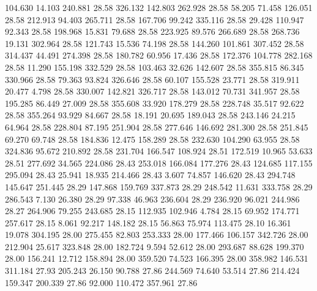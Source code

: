  104.630   14.103  240.881        28.58
 326.132  142.803  262.928        28.58
  58.205   71.458  126.051        28.58
 212.913   94.403  265.711        28.58
 167.706   99.242  335.116        28.58
  29.428  110.947   92.343        28.58
 198.968   15.831   79.688        28.58
 223.925   89.576  266.689        28.58
 268.736   19.131  302.964        28.58
 121.743   15.536   74.198        28.58
 144.260  101.861  307.452        28.58
 314.437   44.491  274.398        28.58
 180.782   60.956   17.436        28.58
 172.376  104.778  282.168        28.58
  11.290  155.198  332.529        28.58
 103.463   32.626  142.607        28.58
 355.815   86.345  330.966        28.58
  79.363   93.824  326.646        28.58
  60.107  155.528   23.771        28.58
 319.911   20.477    4.798        28.58
 330.007  142.821  326.717        28.58
 143.012   70.731  341.957        28.58
 195.285   86.449   27.009        28.58
 355.608   33.920  178.279        28.58
 228.748   35.517   92.622        28.58
 355.264   93.929   84.667        28.58
  18.191   20.695  189.043        28.58
 243.146   24.215   64.964        28.58
 228.804   87.195  251.904        28.58
 277.646  146.692  281.300        28.58
 251.845   69.270   69.748        28.58
 184.836   12.475  158.289        28.58
 232.630  104.290   63.955        28.58
 324.836   95.672  210.892        28.58
 231.704  166.547  108.924        28.51
 172.519   10.965   53.633        28.51
 277.692   34.565  224.086        28.43
 253.018  166.084  177.276        28.43
 124.685  117.155  295.094        28.43
  25.941   18.935  214.466        28.43
   3.607   74.857  146.620        28.43
 294.748  145.647  251.445        28.29
 147.868  159.769  337.873        28.29
 248.542   11.631  333.758        28.29
 286.543    7.130   26.380        28.29
  97.338   46.963  236.604        28.29
 236.920   96.021  244.986        28.27
 264.906   79.255  243.685        28.15
 112.935  102.946    4.784        28.15
  69.952  174.771  257.617        28.15
   8.061   92.217  148.182        28.15
  56.863   75.974  113.475        28.10
  16.361   19.078  304.195        28.00
 275.455   82.803  253.333        28.00
 177.466  106.157  342.726        28.00
 212.904   25.617  323.848        28.00
 182.724    9.594   52.612        28.00
 293.687   88.628  199.370        28.00
 156.241   12.712  158.894        28.00
 359.520   74.523  166.395        28.00
 358.982  146.531  311.184        27.93
 205.243   26.150   90.788        27.86
 244.569   74.640   53.514        27.86
 214.424  159.347  200.339        27.86
  92.000  110.472  357.961        27.86
